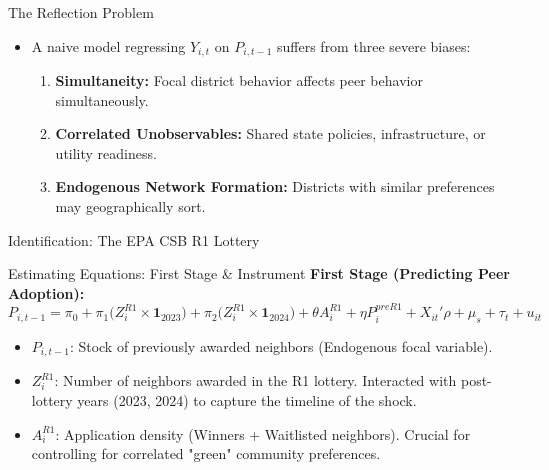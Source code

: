 \documentclass[aspectratio=169]{beamer}
\begin{document}

\begin{frame}{The Reflection Problem}
    \begin{itemize}
        \item A naive model regressing $Y_{i,t}$ on $P_{i,t-1}$ suffers from three severe biases:
        \begin{enumerate}
            \item \textbf{Simultaneity:} Focal district behavior affects peer behavior simultaneously.
            \item \textbf{Correlated Unobservables:} Shared state policies, infrastructure, or utility readiness.
            \item \textbf{Endogenous Network Formation:} Districts with similar preferences may geographically sort.
        \end{enumerate}
    \end{itemize}
\end{frame}

\begin{frame}{Identification: The EPA CSB R1 Lottery}
\end{frame}

\begin{frame}{Estimating Equations: First Stage \& Instrument}
    \textbf{First Stage (Predicting Peer Adoption):}
    $$ P_{i,t-1} = \pi_0 + \pi_1 \big(Z_i^{R1}\times \mathbf{1}_{2023}\big) + \pi_2 \big(Z_i^{R1}\times \mathbf{1}_{2024}\big) + \theta A_i^{R1} + \eta P_i^{preR1} + X_{it}'\rho + \mu_s + \tau_t + u_{it} $$
    
    \begin{itemize}
        \item \textbf{$P_{i,t-1}$}: Stock of previously awarded neighbors (Endogenous focal variable).
        \item \textbf{$Z_i^{R1}$}: Number of neighbors awarded in the R1 lottery. Interacted with post-lottery years (2023, 2024) to capture the timeline of the shock.
        \item \textbf{$A_i^{R1}$}: Application density (Winners + Waitlisted neighbors). Crucial for controlling for correlated "green" community preferences.
    \end{itemize}
\end{frame}
\end{document}
